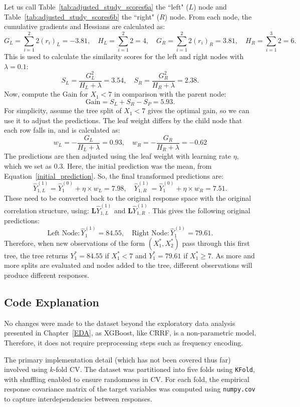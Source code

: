 \documentclass[11pt]{report} %
\begin{document}
\noindent Let us call Table~\ref{tab:adjusted_study_scores6a} the ``left" ($L$) node and Table~\ref{tab:adjusted_study_scores6b} the ``right" ($R$) node. From each node, the cumulative gradients and Hessians are calculated as:
\[
G_L = \sum_{i=1}^{2} 2(r_i)_L=-3.81, \quad H_L = \sum_{i=1}^{2} 2=4, \quad
G_R = \sum_{i=1}^{2} 2(r_i)_R=3.81, \quad H_R = \sum_{i=1}^{3} 2=6.
\]
This is used to calculate the similarity scores for the left and right nodes with $\lambda = 0.1$:
\[
S_L = \frac{G_L^2}{H_L + \lambda}=3.54, \quad S_R = \frac{G_R^2}{H_R + \lambda}=2.38.
\]
Now, compute the Gain for $X_1 < 7$ in comparison with the parent node:
\[
\text{Gain} =  S_L+S_R - S_P = 5.93.
\]
For simplicity, assume the tree split of \( X_1 < 7 \) gives the optimal gain, so we can use it to adjust the predictions. The leaf weight differs by the child node that each row falls in, and is calculated as:
\[
w_L = -\frac{G_L}{H_L + \lambda}=0.93, \quad w_R = -\frac{G_R}{H_R + \lambda}=-0.62
\]
The predictions are then adjusted using the leaf weight with learning rate $\eta$, which we set as 0.3. Here, the initial prediction was the mean, from Equation~\ref{initial_prediction}. So, the final transformed predictions are: 
\[
\hat{Y}_{1,L}^{(1)} = \hat{Y}_1^{(0)}+\eta\times w_L=7.98,\quad \hat{Y}_{1,R}^{(1)} = \hat{Y}_1^{(0)}+\eta\times w_R=7.51.
\]
These need to be converted back to the original response space with the original correlation structure, using: $\mathbf{L}\hat{Y}_{1, L}^{(1)}$ and $\mathbf{L}\hat{Y}_{1, R}^{(1)}$. This gives the following original predictions:
\[
\text{Left Node}: \hat{Y}_{1}^{(1)}=84.55, \quad \text{Right Node}: \hat{Y}_{1}^{(1)}=79.61.
\]
Therefore, when new observations of the form $(X^*_1, X^*_2)$ pass through this first tree, the tree returns $Y^*_1=84.55$ if $X^*_1<7$ and $Y^*_1=79.61$ if $X^*_1 \geq 7$. As more and more splits are evaluated and nodes added to the tree, different observations will produce different responses.

\vspace{-0.3cm}
\subsection{Code Explanation}
No changes were made to the dataset beyond the exploratory data analysis presented in Chapter~\ref{EDA}, as XGBoost, like CRRF, is a non-parametric model. Therefore, it does not require preprocessing steps such as frequency encoding.

The primary implementation detail (which has not been covered thus far) involved using \( k \)-fold CV.
The dataset was partitioned into five folds using \texttt{KFold}, with shuffling enabled to ensure randomness in CV.
For each fold, the empirical response covariance matrix of the target variables was computed using \texttt{numpy.cov} to capture interdependencies between responses. 
\end{document}
